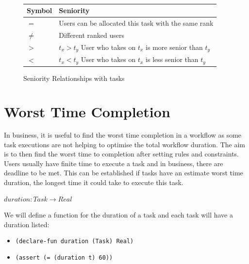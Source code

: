 \documentclass[a4paper]{report}
\begin{document}
\begin{figure}[H]
\centering
{} \\
\begin{tabular}{ |l|l| }
\hline
Symbol & Seniority \\ \hline
$=$ & Users can be allocated this task with the same rank \\ \hline
$\neq$ & Different ranked users \\ \hline
$>$ & $t_x > t_y$ User who takes on $t_x$ is more senior than $t_y$ \\ \hline
$<$ & $t_x < t_y$ User who takes on $t_x$ is less senior than $t_y$ \\ 
\hline
\end{tabular}
\caption{Seniority Relationships with tasks}
\label{fig:Seniority Relationships with tasks}
\end{figure}

\section{Worst Time Completion}
In business, it is useful to find the worst time completion in a workflow as some task executions are not helping to optimise the total workflow duration. The aim is to then find the worst time to completion after setting rules and constraints. Users usually have finite time to execute a task and in business, there are deadline to be met. This can be established if tasks have an estimate worst time duration, the longest time it could take to execute this task. 
\begin{center}
$duration : Task \rightarrow Real$
\end{center}
We will define a function for the duration of a task and each task will have a duration listed:
\begin{itemize}
\item \texttt{(declare-fun duration (Task) Real)}
\item \texttt{(assert (= (duration t) 60))}
\end{itemize}
\end{document}
